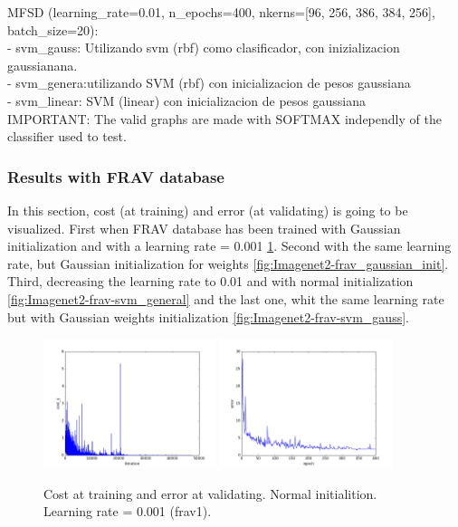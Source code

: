 MFSD  (learning\_rate=0.01, n\_epochs=400, nkerns=[96, 256, 386, 384, 256], batch\_size=20):\\
- svm\_gauss: Utilizando svm (rbf) como clasificador, con inizializacion gaussianana.\\
- svm\_genera:utilizando SVM (rbf) con inicializacion de pesos gaussiana \\
- svm\_linear: SVM (linear) con inicializacion de pesos gaussiana\\

IMPORTANT: The valid graphs are made with SOFTMAX independly of the classifier used to test.\\

\subsubsection{Results with FRAV database}
In this section, cost (at training) and error (at validating) is going to be visualized. First when FRAV database has been trained with Gaussian initialization and with a learning rate = 0.001 \ref{fig:Imagenet2-frav1}. Second with the same learning rate, but Gaussian initialization for weights \ref{fig:Imagenet2-frav_gaussian_init}. Third, decreasing the learning rate to 0.01 and with normal initialization \ref{fig:Imagenet2-frav-svm_general} and the last one, whit the same learning rate but with Gaussian weights initialization \ref{fig:Imagenet2-frav-svm_gauss}.\\

\begin{figure}[htb]
\centering
\includegraphics[width=0.45\textwidth]{images/FRAv_casia_ImageNet/Imagenet2/frav/frav1/cost_frav.png}
\includegraphics[width=0.45\textwidth]{images/FRAv_casia_ImageNet/Imagenet2/frav/frav1/error_frav.png}
\caption{Cost at training and error at validating. Normal initialition. Learning rate = 0.001 (frav1).} \label{fig:Imagenet2-frav1}
\end{figure}

